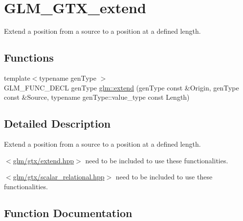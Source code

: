\hypertarget{group__gtx__extend}{}\section{G\+L\+M\+\_\+\+G\+T\+X\+\_\+extend}
\label{group__gtx__extend}


Extend a position from a source to a position at a defined length.  


\subsection*{Functions}
\begin{DoxyCompactItemize}
\item 
{\footnotesize template$<$typename gen\+Type $>$ }\\G\+L\+M\+\_\+\+F\+U\+N\+C\+\_\+\+D\+E\+CL gen\+Type \hyperlink{group__gtx__extend_ga8140caae613b0f847ab0d7175dc03a37}{glm\+::extend} (gen\+Type const \&Origin, gen\+Type const \&Source, typename gen\+Type\+::value\+\_\+type const Length)
\end{DoxyCompactItemize}


\subsection{Detailed Description}
Extend a position from a source to a position at a defined length. 

$<$\hyperlink{extend_8hpp}{glm/gtx/extend.\+hpp}$>$ need to be included to use these functionalities.

$<$\hyperlink{scalar__relational_8hpp}{glm/gtx/scalar\+\_\+relational.\+hpp}$>$ need to be included to use these functionalities. 

\subsection{Function Documentation}
